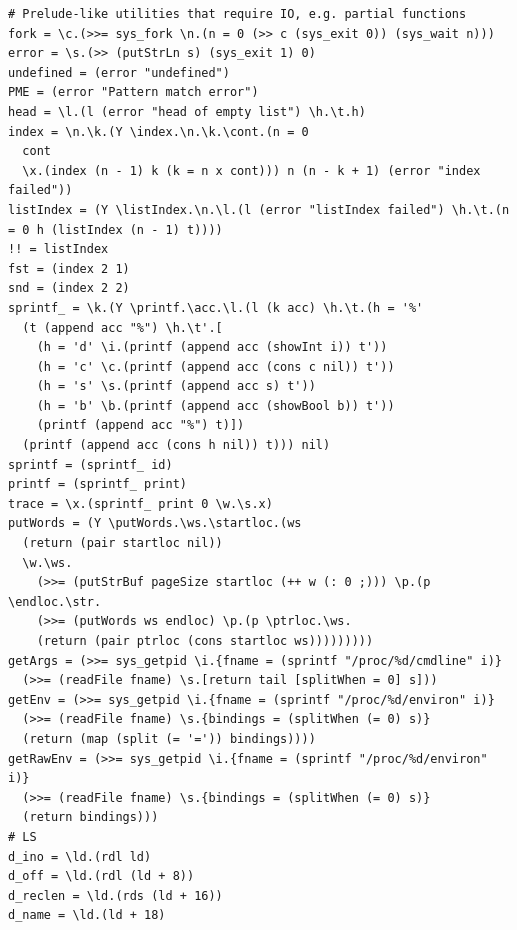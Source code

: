 \begin{verbatim}
# Prelude-like utilities that require IO, e.g. partial functions
fork = \c.(>>= sys_fork \n.(n = 0 (>> c (sys_exit 0)) (sys_wait n)))
error = \s.(>> (putStrLn s) (sys_exit 1) 0)
undefined = (error "undefined")
PME = (error "Pattern match error")
head = \l.(l (error "head of empty list") \h.\t.h)
index = \n.\k.(Y \index.\n.\k.\cont.(n = 0
  cont
  \x.(index (n - 1) k (k = n x cont))) n (n - k + 1) (error "index failed"))
listIndex = (Y \listIndex.\n.\l.(l (error "listIndex failed") \h.\t.(n = 0 h (listIndex (n - 1) t))))
!! = listIndex
fst = (index 2 1)
snd = (index 2 2)
sprintf_ = \k.(Y \printf.\acc.\l.(l (k acc) \h.\t.(h = '%'
  (t (append acc "%") \h.\t'.[
    (h = 'd' \i.(printf (append acc (showInt i)) t'))
    (h = 'c' \c.(printf (append acc (cons c nil)) t'))
    (h = 's' \s.(printf (append acc s) t'))
    (h = 'b' \b.(printf (append acc (showBool b)) t'))
    (printf (append acc "%") t)])
  (printf (append acc (cons h nil)) t))) nil)
sprintf = (sprintf_ id)
printf = (sprintf_ print)
trace = \x.(sprintf_ print 0 \w.\s.x)
putWords = (Y \putWords.\ws.\startloc.(ws
  (return (pair startloc nil))
  \w.\ws.
    (>>= (putStrBuf pageSize startloc (++ w (: 0 ;))) \p.(p \endloc.\str.
    (>>= (putWords ws endloc) \p.(p \ptrloc.\ws.
    (return (pair ptrloc (cons startloc ws)))))))))
getArgs = (>>= sys_getpid \i.{fname = (sprintf "/proc/%d/cmdline" i)}
  (>>= (readFile fname) \s.[return tail [splitWhen = 0] s]))
getEnv = (>>= sys_getpid \i.{fname = (sprintf "/proc/%d/environ" i)}
  (>>= (readFile fname) \s.{bindings = (splitWhen (= 0) s)}
  (return (map (split (= '=')) bindings))))
getRawEnv = (>>= sys_getpid \i.{fname = (sprintf "/proc/%d/environ" i)}
  (>>= (readFile fname) \s.{bindings = (splitWhen (= 0) s)}
  (return bindings)))
# LS 
d_ino = \ld.(rdl ld)
d_off = \ld.(rdl (ld + 8))
d_reclen = \ld.(rds (ld + 16))
d_name = \ld.(ld + 18)


\end{verbatim}
